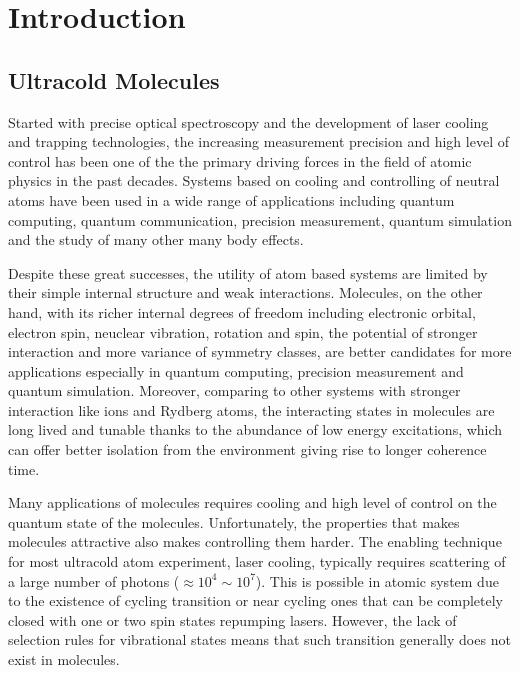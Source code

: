 
\chapter{Introduction}
\label{ch:introduction}

\section{Ultracold Molecules}
\label{ch:introduction:molecules}

Started with precise optical spectroscopy and the development of laser cooling
and trapping technologies, the increasing measurement precision and
high level of control has been one of the the primary driving forces
in the field of atomic physics in the past decades.
Systems based on cooling and controlling of neutral atoms
have been used in a wide range of applications including
quantum computing, quantum communication, precision measurement,
quantum simulation and the study of many other many body effects.

Despite these great successes, the utility of atom based systems
are limited by their simple internal structure and weak interactions.
Molecules, on the other hand, with its richer internal degrees of freedom
including electronic orbital, electron spin, neuclear vibration, rotation and spin,
the potential of stronger interaction and more variance of symmetry classes,
are better candidates for more applications especially in
quantum computing, precision measurement and quantum simulation.
Moreover, comparing to other systems with stronger interaction like ions and Rydberg atoms,
the interacting states in molecules are long lived and tunable thanks to
the abundance of low energy excitations,
which can offer better isolation from the environment giving rise to longer coherence time.

Many applications of molecules requires cooling and high level of control
on the quantum state of the molecules.
Unfortunately, the properties that makes molecules attractive
also makes controlling them harder.
The enabling technique for most ultracold atom experiment, laser cooling,
typically requires scattering of a large number of photons ($\approx10^4\sim10^7$).
This is possible in atomic system due to the existence of cycling transition
or near cycling ones that can be completely closed with
one or two spin states repumping lasers.
However, the lack of selection rules for vibrational states means that
such transition generally does not exist in molecules.

